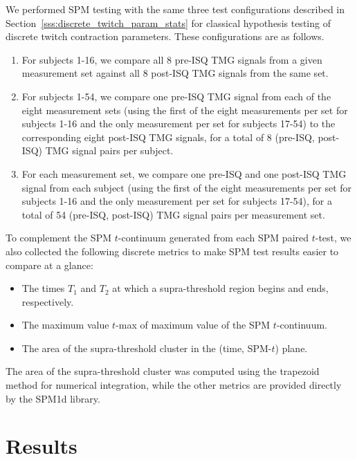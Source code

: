 \documentclass[utf8]{FrontiersinHarvard}
\begin{document}
We performed SPM testing with the same three test configurations described in Section~\ref{sss:discrete_twitch_param_stats} for classical hypothesis testing of discrete twitch contraction parameters.
These configurations are as follows.
\begin{enumerate}

    \item For subjects 1-16, we compare all 8 pre-ISQ TMG signals from a given measurement set against all 8 post-ISQ TMG signals from the same set.

    \item For subjects 1-54, we compare one pre-ISQ TMG signal from each of the eight measurement sets (using the first of the eight measurements per set for subjects 1-16 and the only measurement per set for subjects 17-54) to the corresponding eight post-ISQ TMG signals, for a total of 8 (pre-ISQ, post-ISQ) TMG signal pairs per subject.

    \item For each measurement set, we compare one pre-ISQ and one post-ISQ TMG signal from each subject (using the first of the eight measurements per set for subjects 1-16 and the only measurement per set for subjects 17-54), for a total of 54 (pre-ISQ, post-ISQ) TMG signal pairs per measurement set.

\end{enumerate}

To complement the SPM $ t $-continuum generated from each SPM paired $ t $-test, we also collected the following discrete metrics to make SPM test results easier to compare at a glance:
\begin{itemize}

    \item The times $ T_{1} $ and $ T_{2} $ at which a supra-threshold region begins and ends, respectively.
    \item The maximum value $ t $-max of maximum value of the SPM $ t $-continuum.
    \item The area of the supra-threshold cluster in the (time, SPM-$ t $) plane.

\end{itemize}
The area of the supra-threshold cluster was computed using the trapezoid method for numerical integration, while the other metrics are provided directly by the SPM1d library.

\section{Results} \label{s:results}
\end{document}
